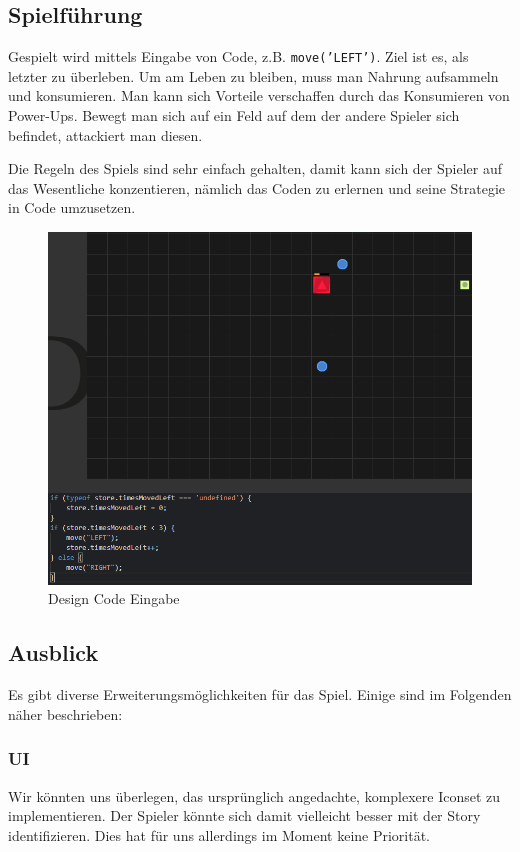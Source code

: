 \documentclass[11pt,a4paper,titlepage]{article}
\begin{document}
\subsection{Spielführung}

Gespielt wird mittels Eingabe von Code, z.B. \texttt{move('LEFT')}. Ziel ist es, als letzter zu überleben. Um am Leben zu bleiben, muss man Nahrung aufsammeln und konsumieren. Man kann sich Vorteile verschaffen durch das Konsumieren von Power-Ups. Bewegt man sich auf ein Feld auf dem der andere Spieler sich befindet, attackiert man diesen.

Die Regeln des Spiels sind sehr einfach gehalten, damit kann sich der Spieler auf das Wesentliche konzentieren, nämlich das Coden zu erlernen und seine Strategie in Code umzusetzen.

\begin{figure}[H]
	\includegraphics[width=\textwidth]{game2.png}
	\caption{Design Code Eingabe}
\end{figure}


\subsection{Ausblick}

Es gibt diverse Erweiterungsmöglichkeiten für das Spiel. Einige sind im Folgenden näher beschrieben:

\subsubsection{UI}
Wir könnten uns überlegen, das ursprünglich angedachte, komplexere Iconset zu implementieren. Der Spieler könnte sich damit vielleicht besser mit der Story identifizieren. Dies hat für uns allerdings im Moment keine Priorität.
\end{document}
